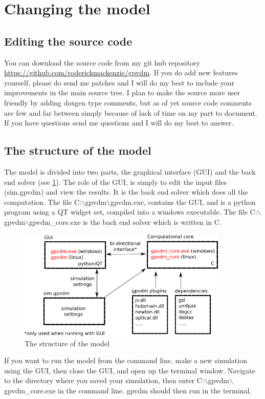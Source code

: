 \documentclass[11pt]{article}
\begin{document}
\section{Changing the model}
\subsection{Editing the source code}
You can download the source code from my git hub repository \url{https://github.com/roderickmackenzie/gpvdm}.  If you do add new features yourself, please do send me patches and I will do my best to include your improvements in the main source tree.  I plan to make the source more user friendly by adding doxgen type comments, but as of yet source code comments are few and far between simply because of lack of time on my part to document.  If you have questions send me questions and I will do my best to answer.

\subsection{The structure of the model}
The model is divided into two parts, the graphical interface (GUI) and the back end solver (see \ref{fig:structureofthemodel}).  The role of the GUI, is simply to edit the input files (sim.gpvdm) and view the results.  It is the back end solver which does all the computation.  The file C:$\backslash$gpvdm$\backslash$gpvdm.exe, contains the GUI, and is a python program using a QT widget set, compiled into a windows executable.  The file C:$\backslash$gpvdm$\backslash$gpvdm\_core.exe is the back end solver which is written in C.
\begin{figure}
\centering
\includegraphics[width=100mm]{./images/architecture.png}
\caption{The structure of the model}
\label{fig:structureofthemodel}
\end{figure}
If you want to run the model from the command line, make a new simulation using the GUI, then close the GUI, and open up the terminal window.  Navigate to the directory where you saved your simulation, then enter C:$\backslash$gpvdm$\backslash$gpvdm\_core.exe in the command line.  gpvdm should then run in the terminal.
\end{document}
